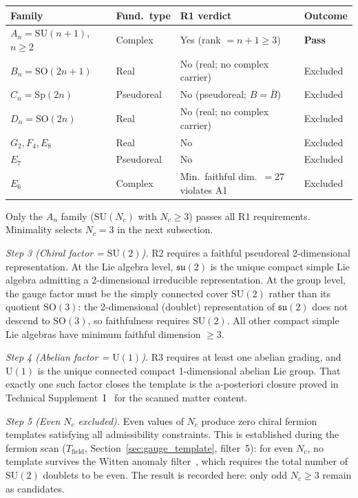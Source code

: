 \documentclass[11pt]{article}
\newcommand{\SU}{\mathrm{SU}}
\newcommand{\U}{\mathrm{U}}
\begin{document}
\begin{tcolorbox}[apfbox, title={Lemma $L_{\mathrm{gauge,unique}}$ (Gauge Template Uniqueness)}]
\smallskip
\begin{center}
\small
\begin{tabular}{llp{4.2cm}l}
\toprule
\textbf{Family} & \textbf{Fund.\ type} & \textbf{R1 verdict} & \textbf{Outcome} \\
\midrule
$A_n = \SU(n\!+\!1)$, $n \ge 2$ & Complex & Yes (rank $= n+1 \ge 3$) & \textbf{Pass} \\
$B_n = \mathrm{SO}(2n\!+\!1)$ & Real & No (real; no complex carrier) & Excluded \\
$C_n = \mathrm{Sp}(2n)$ & Pseudoreal & No (pseudoreal; $B = \bar{B}$) & Excluded \\
$D_n = \mathrm{SO}(2n)$ & Real & No (real; no complex carrier) & Excluded \\
$G_2, F_4, E_8$ & Real & No & Excluded \\
$E_7$ & Pseudoreal & No & Excluded \\
$E_6$ & Complex & Min.\ faithful dim.\ $= 27$ violates A1 & Excluded \\
\bottomrule
\end{tabular}
\end{center}
\smallskip

Only the $A_n$ family ($\SU(N_c)$ with $N_c \ge 3$) passes all R1 requirements.  Minimality selects $N_c = 3$ in the next subsection.

\medskip\noindent\textit{Step 3 (Chiral factor = $\SU(2)$).}  R2 requires a faithful pseudoreal 2-dimensional representation.  At the Lie algebra level, $\mathfrak{su}(2)$ is the unique compact simple Lie algebra admitting a 2-dimensional irreducible representation.  At the group level, the gauge factor must be the simply connected cover $\SU(2)$ rather than its quotient $\mathrm{SO}(3)$: the 2-dimensional (doublet) representation of $\mathfrak{su}(2)$ does not descend to $\mathrm{SO}(3)$, so faithfulness requires $\SU(2)$.  All other compact simple Lie algebras have minimum faithful dimension $\ge 3$.

\medskip\noindent\textit{Step 4 (Abelian factor = $\U(1)$).}  R3 requires at least one abelian grading, and $\U(1)$ is the unique connected compact 1-dimensional abelian Lie group.  That exactly one such factor closes the template is the a-posteriori closure proved in Technical Supplement~I~\cite{BrookeP2Supplement} for the scanned matter content.

\medskip\noindent\textit{Step 5 (Even $N_c$ excluded).}  Even values of $N_c$ produce zero chiral fermion templates satisfying all admissibility constraints.  This is established during the fermion scan ($T_{\mathrm{field}}$, Section~\ref{sec:gauge_template}, filter~5): for even $N_c$, no template survives the Witten anomaly filter~\cite{Witten1982}, which requires the total number of $\SU(2)$ doublets to be even.  The result is recorded here: only odd $N_c \ge 3$ remain as candidates.


\end{tcolorbox}
\end{document}
